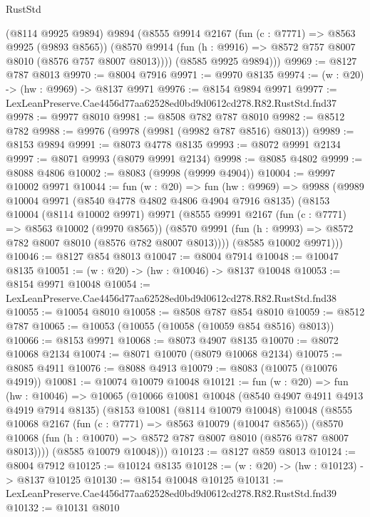 \begin{lexlean}{RustStd}
\begin{coremodule}
        (@8114 @9925 @9894)
        @9894
        (@8555
          @9914
          @2167
          (fun (c : @7771) => @8563 @9925 (@9893 @8565))
          (@8570 @9914 (fun (h : @9916) => @8572 @757 @8007 @8010 (@8576 @757 @8007 @8013))))
        (@8585 @9925 @9894)))
@9969 := @8127 @787 @8013
@9970 := @8004 @7916
@9971 := @9970 @8135
@9974 := (w : @20) -> (hw : @9969) -> @8137 @9971
@9976 := @8154 @9894 @9971
@9977 := LexLeanPreserve.Cae4456d77aa62528ed0bd9d0612cd278.R82.RustStd.fnd37
@9978 := @9977 @8010
@9981 := @8508 @782 @787 @8010
@9982 := @8512 @782
@9988 := @9976 (@9978 (@9981 (@9982 @787 @8516) @8013))
@9989 := @8153 @9894
@9991 := @8073 @4778 @8135
@9993 := @8072 @9991 @2134
@9997 := @8071 @9993 (@8079 @9991 @2134)
@9998 := @8085 @4802
@9999 := @8088 @4806
@10002 := @8083 (@9998 (@9999 @4904))
@10004 := @9997 @10002 @9971
@10044 := fun (w : @20) =>
  fun (hw : @9969) =>
  @9988
    (@9989
      @10004
      @9971
      (@8540 @4778 @4802 @4806 @4904 @7916 @8135)
      (@8153
        @10004
        (@8114 @10002 @9971)
        @9971
        (@8555
          @9991
          @2167
          (fun (c : @7771) => @8563 @10002 (@9970 @8565))
          (@8570 @9991 (fun (h : @9993) => @8572 @782 @8007 @8010 (@8576 @782 @8007 @8013))))
        (@8585 @10002 @9971)))
@10046 := @8127 @854 @8013
@10047 := @8004 @7914
@10048 := @10047 @8135
@10051 := (w : @20) -> (hw : @10046) -> @8137 @10048
@10053 := @8154 @9971 @10048
@10054 := LexLeanPreserve.Cae4456d77aa62528ed0bd9d0612cd278.R82.RustStd.fnd38
@10055 := @10054 @8010
@10058 := @8508 @787 @854 @8010
@10059 := @8512 @787
@10065 := @10053 (@10055 (@10058 (@10059 @854 @8516) @8013))
@10066 := @8153 @9971
@10068 := @8073 @4907 @8135
@10070 := @8072 @10068 @2134
@10074 := @8071 @10070 (@8079 @10068 @2134)
@10075 := @8085 @4911
@10076 := @8088 @4913
@10079 := @8083 (@10075 (@10076 @4919))
@10081 := @10074 @10079 @10048
@10121 := fun (w : @20) =>
  fun (hw : @10046) =>
  @10065
    (@10066
      @10081
      @10048
      (@8540 @4907 @4911 @4913 @4919 @7914 @8135)
      (@8153
        @10081
        (@8114 @10079 @10048)
        @10048
        (@8555
          @10068
          @2167
          (fun (c : @7771) => @8563 @10079 (@10047 @8565))
          (@8570 @10068 (fun (h : @10070) => @8572 @787 @8007 @8010 (@8576 @787 @8007 @8013))))
        (@8585 @10079 @10048)))
@10123 := @8127 @859 @8013
@10124 := @8004 @7912
@10125 := @10124 @8135
@10128 := (w : @20) -> (hw : @10123) -> @8137 @10125
@10130 := @8154 @10048 @10125
@10131 := LexLeanPreserve.Cae4456d77aa62528ed0bd9d0612cd278.R82.RustStd.fnd39
@10132 := @10131 @8010

\end{coremodule}
\end{lexlean}

